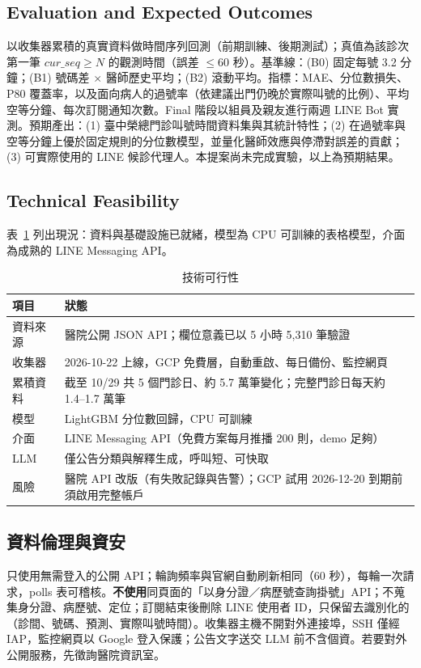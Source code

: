 \documentclass[11pt,twocolumn]{article}
\begin{document}
\subsection{Evaluation and Expected Outcomes}
以收集器累積的真實資料做時間序列回測（前期訓練、後期測試）；真值為該診次第一筆 $\mathit{cur\_seq}\geq N$ 的觀測時間（誤差 $\leq$60 秒）。基準線：(B0) 固定每號 3.2 分鐘；(B1) 號碼差 $\times$ 醫師歷史平均；(B2) 滾動平均。指標：MAE、分位數損失、P80 覆蓋率，以及面向病人的過號率（依建議出門仍晚於實際叫號的比例）、平均空等分鐘、每次訂閱通知次數。Final 階段以組員及親友進行兩週 LINE Bot 實測。預期產出：(1) 臺中榮總門診叫號時間資料集與其統計特性；(2) 在過號率與空等分鐘上優於固定規則的分位數模型，並量化醫師效應與停滯對誤差的貢獻；(3) 可實際使用的 LINE 候診代理人。本提案尚未完成實驗，以上為預期結果。

\subsection{Technical Feasibility}
表~\ref{tab:feas} 列出現況：資料與基礎設施已就緒，模型為 CPU 可訓練的表格模型，介面為成熟的 LINE Messaging API。
\begin{table}[!htb]
\centering\linespread{1.0}\selectfont\small
\caption{技術可行性}
\label{tab:feas}
\begin{tabularx}{\columnwidth}{@{}>{\raggedright\arraybackslash}p{1.9cm}X@{}}
\toprule
項目 & 狀態\\
\midrule
資料來源 & 醫院公開 JSON API；欄位意義已以 5 小時 5,310 筆驗證\\
收集器 & 2026-10-22 上線，GCP 免費層，自動重啟、每日備份、監控網頁\\
累積資料 & 截至 10/29 共 5 個門診日、約 5.7 萬筆變化；完整門診日每天約 1.4--1.7 萬筆\\
模型 & LightGBM 分位數回歸，CPU 可訓練\\
介面 & LINE Messaging API（免費方案每月推播 200 則，demo 足夠）\\
LLM & 僅公告分類與解釋生成，呼叫短、可快取\\
風險 & 醫院 API 改版（有失敗記錄與告警）；GCP 試用 2026-12-20 到期前須啟用完整帳戶\\
\bottomrule
\end{tabularx}
\end{table}

\subsection{資料倫理與資安}
只使用無需登入的公開 API；輪詢頻率與官網自動刷新相同（60 秒），每輪一次請求，polls 表可稽核。\textbf{不使用}同頁面的「以身分證／病歷號查詢掛號」API；不蒐集身分證、病歷號、定位；訂閱結束後刪除 LINE 使用者 ID，只保留去識別化的（診間、號碼、預測、實際叫號時間）。收集器主機不開對外連接埠，SSH 僅經 IAP，監控網頁以 Google 登入保護；公告文字送交 LLM 前不含個資。若要對外公開服務，先徵詢醫院資訊室。
\end{document}

